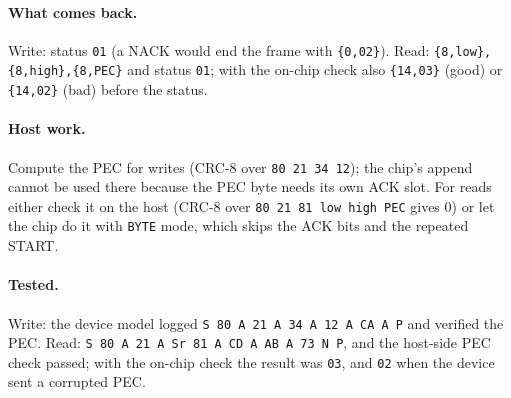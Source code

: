 \documentclass[11pt,a4paper]{article}
\newcommand{\sig}[1]{\texttt{#1}}
\begin{document}
\paragraph{What comes back.} Write: status \texttt{01} (a NACK would end the frame with \texttt{\{0,02\}}). Read: \texttt{\{8,low\},\{8,high\},\{8,PEC\}} and status \texttt{01}; with the on-chip check also \texttt{\{14,03\}} (good) or \texttt{\{14,02\}} (bad) before the status.

\paragraph{Host work.} Compute the PEC for writes (CRC-8 over \texttt{80 21 34 12}); the chip's append cannot be used there because the PEC byte needs its own ACK slot. For reads either check it on the host (CRC-8 over \texttt{80 21 81 low high PEC} gives 0) or let the chip do it with \sig{BYTE} mode, which skips the ACK bits and the repeated START.

\paragraph{Tested.} Write: the device model logged \texttt{S 80 A 21 A 34 A 12 A CA A P} and verified the PEC. Read: \texttt{S 80 A 21 A Sr 81 A CD A AB A 73 N P}, and the host-side PEC check passed; with the on-chip check the result was \texttt{03}, and \texttt{02} when the device sent a corrupted PEC.
\end{document}
